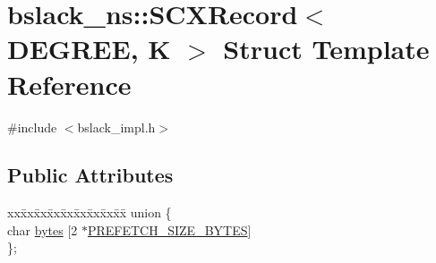 \hypertarget{structbslack__ns_1_1SCXRecord}{}\section{bslack\+\_\+ns\+:\+:S\+C\+X\+Record$<$ D\+E\+G\+R\+EE, K $>$ Struct Template Reference}
\label{structbslack__ns_1_1SCXRecord}


{\ttfamily \#include $<$bslack\+\_\+impl.\+h$>$}

\subsection*{Public Attributes}
\begin{DoxyCompactItemize}
\item 
\begin{tabbing}
xx\=xx\=xx\=xx\=xx\=xx\=xx\=xx\=xx\=\kill
union \{\\
\>char \hyperlink{structbslack__ns_1_1SCXRecord_aa16b6644e2f456ed9330846ebc7b0804}{bytes} \mbox{[}2 $\ast$\hyperlink{plaf_8h_a9492d3f4847aa8514510373df7ad0e73}{PREFETCH\_SIZE\_BYTES}\mbox{]}\\
\}; \\


\end{tabbing}
\end{DoxyCompactItemize}
